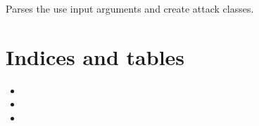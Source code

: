 \documentclass[letterpaper,10pt,english]{sphinxmanual}
\begin{document}
\begin{fulllineitems}
\label{\detokenize{MLSCAlib:MLSCAlib.main.script_parser}}
\pysigstartsignatures
{}
\pysigstopsignatures
\sphinxAtStartPar
Parses the use input arguments and create attack classes.

\end{fulllineitems}



\chapter{Indices and tables}
\label{\detokenize{index:indices-and-tables}}\begin{itemize}
\item {} 
\sphinxAtStartPar
{}

\item {} 
\sphinxAtStartPar
{}

\item {} 
\sphinxAtStartPar
{}

\end{itemize}
\end{document}

